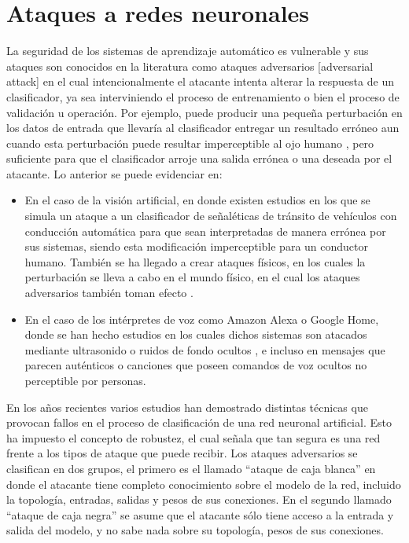 

\chapter{Ataques a redes neuronales} %

\label{Ataques} %

La seguridad de los sistemas de aprendizaje automático es vulnerable y sus ataques son conocidos en la literatura como ataques adversarios [adversarial attack] en el cual intencionalmente el atacante intenta alterar la respuesta de un clasificador, ya sea interviniendo el proceso de entrenamiento o bien el proceso de validación u operación. Por ejemplo, puede producir una pequeña perturbación en los datos de entrada \parencite{r49} que llevaría al clasificador entregar un resultado erróneo aun cuando esta perturbación puede resultar imperceptible al ojo humano \parencite{r4}, pero suficiente para que el clasificador arroje una salida errónea o una deseada por el atacante. Lo anterior se puede evidenciar en:
\begin{itemize}

\item En el caso de la visión artificial, en donde existen estudios en los que se simula un ataque a un clasificador de señaléticas de tránsito de vehículos con conducción automática \parencite{r8} para que sean interpretadas de manera errónea por sus sistemas, siendo esta modificación imperceptible para un conductor humano. También se ha llegado a crear ataques físicos, en los cuales la perturbación se lleva a cabo en el mundo físico, en el cual los ataques adversarios también toman efecto \parencite{r12}. 

\item En el caso de los intérpretes de voz como Amazon Alexa o Google Home, donde se han hecho estudios en los cuales dichos sistemas son atacados mediante ultrasonido o ruidos de fondo ocultos \parencite{r17}, e incluso en mensajes que parecen auténticos o canciones \parencite{r31} que poseen comandos de voz ocultos no perceptible por personas.
    
\end{itemize}
En los años recientes varios estudios han demostrado distintas técnicas que provocan fallos en el proceso de clasificación de una red neuronal artificial. Esto ha impuesto el concepto de robustez, el cual señala que tan segura es una red frente a los tipos de ataque que puede recibir. Los ataques adversarios se clasifican en dos grupos, el primero es el llamado “ataque de caja blanca” \parencite{r19} en donde el atacante tiene completo conocimiento sobre el modelo de la red, incluido la topología, entradas, salidas y pesos de sus conexiones. En el segundo llamado “ataque de caja negra” se asume que el atacante sólo tiene acceso a la entrada y salida del modelo, y no sabe nada sobre su topología, pesos de sus conexiones. 
